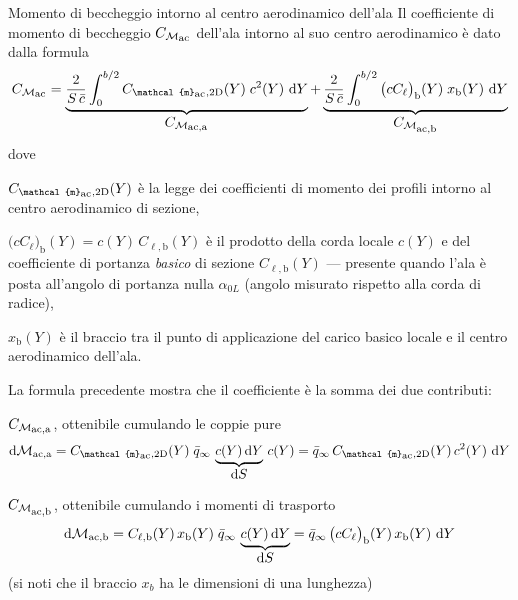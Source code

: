 \documentclass[[12pt,twoside]{book}
\begin{document}
\begin{myExampleX}{Momento di beccheggio intorno al centro aerodinamico dell'ala}{}
Il coefficiente di momento di beccheggio $C_{\mathcal{M}_\mathlarger{\mathrm{ac}}}$ dell'ala
intorno al suo centro aerodinamico è dato dalla formula
\[
C_{\mathcal{M}_\mathlarger{\mathrm{ac}}}
  = 
    \underbrace{%
      \frac{2}{S\,\bar{c}} \int_0^{b/2} C_{\mathcal{m}_\mathlarger{\mathrm{ac}},\mathrm{2D}}(Y) \; c^2(Y)\, \diff{Y}
    }_{ \mathlarger{ C_{\mathcal{M}_\mathlarger{\mathrm{ac,a}}} } } 
    +
    \underbrace{%
      \frac{2}{S\,\bar{c}} \int_0^{b/2} \big(cC_{\ell}\big)_\mathrm{b}(Y) \; x_\mathrm{b}(Y)\, \diff{Y}
    }_{ \mathlarger{ C_{\mathcal{M}_\mathlarger{\mathrm{ac,b}}} } } 
\]
%
dove 
\begin{compactenum}[{\color{gray}$\bullet$}]%
\item
$C_{\mathcal{m}_\mathlarger{\mathrm{ac}},\mathrm{2D}}(Y)$ è la legge dei coefficienti di
momento dei profili intorno al centro aerodinamico di sezione,
\item
$\big(cC_{\ell}\big)_\mathrm{b}(Y) = c(Y) \, C_{\ell,\mathrm{b}} (Y)$ è il prodotto della corda locale
$c(Y)$ e del coefficiente di portanza \emph{basico} di sezione
$C_{\ell,\mathrm{b}}(Y)$ --- presente quando 
l'ala è posta all'angolo di portanza nulla $\alpha_{0L}$ (angolo misurato rispetto alla corda di radice),
\item
$x_\mathrm{b}(Y)$ è il braccio tra il punto di applicazione del carico basico locale e il centro
aerodinamico dell'ala.
\end{compactenum}

La formula precedente mostra che il coefficiente 
è la somma dei due contributi:
\begin{compactenum}
\item
$C_{\mathcal{M}_\mathlarger{\mathrm{ac,a}}}$, ottenibile cumulando le coppie pure
  \[
    \diff{}\mathcal{M}_{\mathrm{ac},\mathrm{a}} 
      = C_{\mathcal{m}_\mathlarger{\mathrm{ac}},\mathrm{2D}}(Y) \; \bar{q}_\infty \,
        \underbrace{%
          c(Y)\diff{Y}
        }_{ \mathlarger{ \diff{S} } }
          \, c(Y)
    = \bar{q}_\infty \, C_{\mathcal{m}_\mathlarger{\mathrm{ac}},\mathrm{2D}}(Y) \, c^2(Y) \, \diff{Y} 
  \]
\item
$C_{\mathcal{M}_\mathlarger{\mathrm{ac,b}}}$, ottenibile cumulando i momenti di trasporto
  \[
    \diff{}\mathcal{M}_{\mathrm{ac},\mathrm{b}} 
      = C_{\ell,\mathrm{b}}(Y)\,x_\mathrm{b}(Y)\; \bar{q}_\infty \, 
        \underbrace{%
          c(Y)\diff{Y}
        }_{ \mathlarger{ \diff{S} } }
    = \bar{q}_\infty \, \big( cC_{\ell} \big)_\mathrm{b} (Y) \,x_\mathrm{b}(Y)\, \diff{Y}
  \]
\hfill(si noti che il braccio $x_b$ ha le dimensioni di una lunghezza)
\end{compactenum}


\end{myExampleX}
\end{document}
